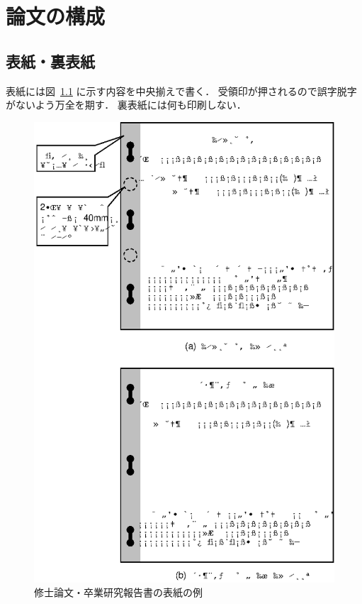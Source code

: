 \documentclass[main]{subfiles}
\begin{document}
\chapter{論文の構成}

\section{表紙・裏表紙}
表紙には図~\ref{fig1} に示す内容を中央揃えで書く．
受領印が押されるので誤字脱字がないよう万全を期す．
裏表紙には何も印刷しない．

\begin{figure}[p] %
\begin{center}
    \includegraphics[scale=1.0]{figures/coverpage.eps}
\caption{修士論文・卒業研究報告書の表紙の例}
\label{fig1} %
\end{center}
\end{figure}
\end{document}
